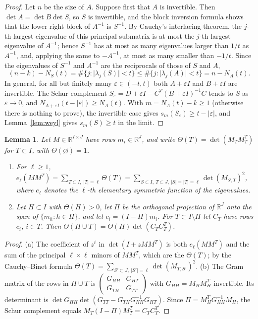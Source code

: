 \documentclass[11pt]{amsart}
\numberwithin{equation}{section}
\newtheorem{lemma}[theorem]{Lemma}
\theoremstyle{definition}
\theoremstyle{remark}
\newcommand{\R}{\mathbb R}
\newcommand{\1}{\mathbf 1}
\newcommand{\abs}[1]{\lvert #1\rvert}
\begin{document}
\begin{proof}
Let $n$ be the size of $A$. Suppose first that $A$ is invertible. Then $\det A=\det B\det S$, so $S$ is invertible, and the block inversion formula shows that the lower right block of $A^{-1}$ is $S^{-1}$. By Cauchy's interlacing theorem, the $j$-th largest eigenvalue of this principal submatrix is at most the $j$-th largest eigenvalue of $A^{-1}$; hence $S^{-1}$ has at most as many eigenvalues larger than $1/t$ as $A^{-1}$, and, applying the same to $-A^{-1}$, at most as many smaller than $-1/t$. Since the eigenvalues of $S^{-1}$ and $A^{-1}$ are the reciprocals of those of $S$ and $A$,
\[
(n-k)-N_S(t)=\#\{j:\abs{\lambda_j(S)}<t\}\le\#\{j:\abs{\lambda_j(A)}<t\}=n-N_A(t).
\]
In general, for all but finitely many $\varepsilon\in(-t,t)$ both $A+\varepsilon I$ and $B+\varepsilon I$ are invertible. The Schur complement $S_\varepsilon=D+\varepsilon I-C^T(B+\varepsilon I)^{-1}C$ tends to $S$ as $\varepsilon\to0$, and $N_{A+\varepsilon I}(t-\abs\varepsilon)\ge N_A(t)$. With $m=N_A(t)-k\ge1$ (otherwise there is nothing to prove), the invertible case gives $s_m(S_\varepsilon)\ge t-\abs\varepsilon$, and Lemma~\ref{lem:weyl} gives $s_m(S)\ge t$ in the limit.
\end{proof}

\begin{lemma}\label{lem:gram}
Let $M\in\R^{I\times J}$ have rows $m_i\in\R^J$, and write $\Theta(T)=\det(M_TM_T^T)$ for $T\subset I$, with $\Theta(\varnothing)=1$.
\begin{enumerate}
\item[(a)] For $\ell\ge1$, $e_\ell(MM^T)=\sum_{T\subset I,\ \abs T=\ell}\Theta(T)=\sum_{S\subset I,\ T\subset J,\ \abs S=\abs T=\ell}\det(M_{S,T})^2$, where $e_\ell$ denotes the $\ell$-th elementary symmetric function of the eigenvalues.
\item[(b)] Let $H\subset I$ with $\Theta(H)>0$, let $\Pi$ be the orthogonal projection of $\R^J$ onto the span of $\{m_h:h\in H\}$, and let $c_i=(I-\Pi)m_i$. For $T\subset I\setminus H$ let $C_T$ have rows $c_i$, $i\in T$. Then $\Theta(H\cup T)=\Theta(H)\det(C_TC_T^T)$.
\end{enumerate}
\end{lemma}

\begin{proof}
(a) The coefficient of $z^\ell$ in $\det(I+zMM^T)$ is both $e_\ell(MM^T)$ and the sum of the principal $\ell\times\ell$ minors of $MM^T$, which are the $\Theta(T)$; by the Cauchy--Binet formula $\Theta(T)=\sum_{S'\subset J,\ \abs{S'}=\ell}\det(M_{T,S'})^2$. (b) The Gram matrix of the rows in $H\cup T$ is $\begin{pmatrix}G_{HH}&G_{HT}\\G_{TH}&G_{TT}\end{pmatrix}$ with $G_{HH}=M_HM_H^T$ invertible. Its determinant is $\det G_{HH}\det(G_{TT}-G_{TH}G_{HH}^{-1}G_{HT})$. Since $\Pi=M_H^TG_{HH}^{-1}M_H$, the Schur complement equals $M_T(I-\Pi)M_T^T=C_TC_T^T$.
\end{proof}
\end{document}

